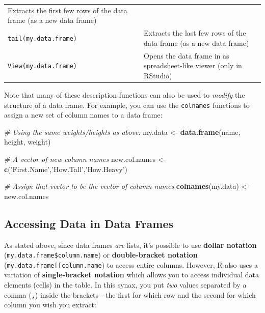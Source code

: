 \documentclass[]{book}
\newenvironment{Shaded}{\begin{snugshade}}{\end{snugshade}}
\newcommand{\KeywordTok}[1]{\textcolor[rgb]{0.13,0.29,0.53}{\textbf{#1}}}
\newcommand{\StringTok}[1]{\textcolor[rgb]{0.31,0.60,0.02}{#1}}
\newcommand{\CommentTok}[1]{\textcolor[rgb]{0.56,0.35,0.01}{\textit{#1}}}
\newcommand{\NormalTok}[1]{#1}
\theoremstyle{definition}
\theoremstyle{definition}
\theoremstyle{remark}
\begin{document}
\begin{longtable}[]{@{}ll@{}}
\begin{minipage}[t]{0.88\columnwidth}
Extracts the first few rows of the data frame (as a new data
frame)\strut
\end{minipage}\tabularnewline
\begin{minipage}[t]{0.07\columnwidth}\raggedright\strut
\texttt{tail(my.data.frame)}\strut
\end{minipage} & \begin{minipage}[t]{0.88\columnwidth}\raggedright\strut
Extracts the last few rows of the data frame (as a new data frame)\strut
\end{minipage}\tabularnewline
\begin{minipage}[t]{0.07\columnwidth}\raggedright\strut
\texttt{View(my.data.frame)}\strut
\end{minipage} & \begin{minipage}[t]{0.88\columnwidth}\raggedright\strut
Opens the data frame in as spreadsheet-like viewer (only in
RStudio)\strut
\end{minipage}\tabularnewline
\bottomrule
\end{longtable}

Note that many of these description functions can also be used to
\emph{modify} the structure of a data frame. For example, you can use
the \texttt{colnames} functions to assign a new set of column names to a
data frame:

\begin{Shaded}
\begin{Highlighting}[]
\CommentTok{# Using the same weights/heights as above:}
\NormalTok{my.data <-}\StringTok{ }\KeywordTok{data.frame}\NormalTok{(name, height, weight)}

\CommentTok{# A vector of new column names}
\NormalTok{new.col.names <-}\StringTok{ }\KeywordTok{c}\NormalTok{(}\StringTok{'First.Name'}\NormalTok{,}\StringTok{'How.Tall'}\NormalTok{,}\StringTok{'How.Heavy'}\NormalTok{)}

\CommentTok{# Assign that vector to be the vector of column names}
\KeywordTok{colnames}\NormalTok{(my.data) <-}\StringTok{ }\NormalTok{new.col.names}
\end{Highlighting}
\end{Shaded}

\subsection{Accessing Data in Data
Frames}\label{accessing-data-in-data-frames}

As stated above, since data frames \emph{are} lists, it's possible to
use \textbf{dollar notation} (\texttt{my.data.frame\$column.name}) or
\textbf{double-bracket notation}
(\texttt{my.data.frame{[}{[}\textquotesingle{}column.name\textquotesingle{}{]}{]}})
to access entire columns. However, R also uses a variation of
\textbf{single-bracket notation} which allows you to access individual
data elements (cells) in the table. In this synax, you put \emph{two}
values separated by a comma (\textbf{\texttt{,}}) inside the
brackets---the first for which row and the second for which column you
wish you extract:
\end{document}
